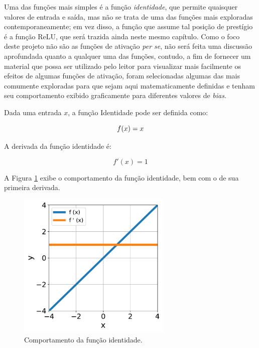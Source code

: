 Uma das funções mais simples é a função \textit{identidade}, que permite quaisquer valores de entrada e saída, mas não se trata de uma das funções mais exploradas contemporaneamente; em vez disso, a função que assume tal posição de prestígio é a função ReLU, que será trazida ainda neste mesmo capítulo. Como o foco deste projeto não são as funções de ativação \textit{per se}, não será feita uma discussão aprofundada quanto a qualquer uma das funções, contudo, a fim de fornecer um material que possa ser utilizado pelo leitor para visualizar mais facilmente os efeitos de algumas funções de ativação, foram selecionadas algumas das mais comumente exploradas para que sejam aqui matematicamente definidas e tenham seu comportamento exibido graficamente para diferentes valores de \textit{bias}.

\pagebreak
\newpage

\begin{definition}
    Dada uma entrada $x$, a função Identidade pode ser definida como:

    \begin{equation}
        f(x) = x
        \vspace{0.2cm}
        \label{eq:ann_identity_function}
    \end{equation}

    A derivada da função identidade é:

    \begin{equation}
        f'(x) = 1
        \label{eq:ann_identity_function_dy}
    \end{equation}
    
\end{definition}

A Figura \ref{fig:ann_identity_function} exibe o comportamento da função identidade, bem com o de sua primeira derivada.

\begin{figure}[H]
    \centering
    \includegraphics[width=0.65\textwidth]{figs/ann_identity_function.pdf}
    \caption{Comportamento da função identidade.}
    \label{fig:ann_identity_function}
\end{figure}


